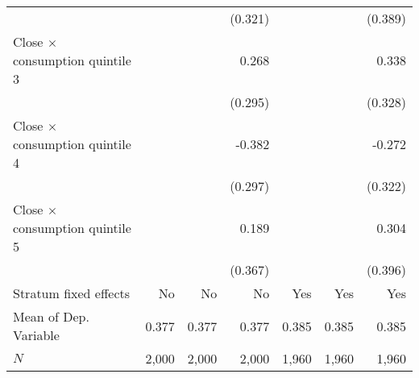 \begin{tabular}{lrrrrrr}
                                      &         &           &   (0.321) &         &           &   (0.389) \\ 
Close $\times$ consumption quintile 3 &         &           &     0.268 &         &           &     0.338 \\ 
                                      &         &           &   (0.295) &         &           &   (0.328) \\ 
Close $\times$ consumption quintile 4 &         &           &    -0.382 &         &           &    -0.272 \\ 
                                      &         &           &   (0.297) &         &           &   (0.322) \\ 
Close $\times$ consumption quintile 5 &         &           &     0.189 &         &           &     0.304 \\ 
                                      &         &           &   (0.367) &         &           &   (0.396) \\ 
\midrule
Stratum fixed effects                 &      No &        No &        No &     Yes &       Yes &       Yes \\ 
Mean of Dep. Variable                 &   0.377 &     0.377 &     0.377 &   0.385 &     0.385 &     0.385 \\ 
$N$                                   &   2,000 &     2,000 &     2,000 &   1,960 &     1,960 &     1,960 \\ 
\bottomrule
\end{tabular}
